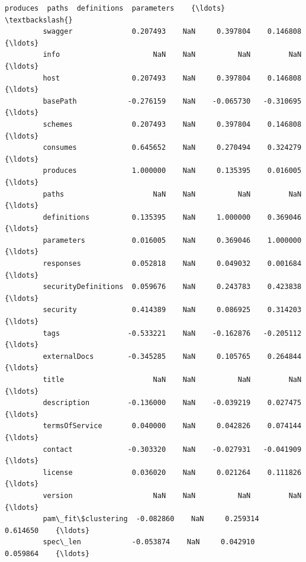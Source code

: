 \documentclass[11pt]{article}
\begin{document}
\begin{Verbatim}[commandchars=\\\{\}]
                              produces  paths  definitions  parameters    {\ldots}     \textbackslash{}
         swagger              0.207493    NaN     0.397804    0.146808    {\ldots}      
         info                      NaN    NaN          NaN         NaN    {\ldots}      
         host                 0.207493    NaN     0.397804    0.146808    {\ldots}      
         basePath            -0.276159    NaN    -0.065730   -0.310695    {\ldots}      
         schemes              0.207493    NaN     0.397804    0.146808    {\ldots}      
         consumes             0.645652    NaN     0.270494    0.324279    {\ldots}      
         produces             1.000000    NaN     0.135395    0.016005    {\ldots}      
         paths                     NaN    NaN          NaN         NaN    {\ldots}      
         definitions          0.135395    NaN     1.000000    0.369046    {\ldots}      
         parameters           0.016005    NaN     0.369046    1.000000    {\ldots}      
         responses            0.052818    NaN     0.049032    0.001684    {\ldots}      
         securityDefinitions  0.059676    NaN     0.243783    0.423838    {\ldots}      
         security             0.414389    NaN     0.086925    0.314203    {\ldots}      
         tags                -0.533221    NaN    -0.162876   -0.205112    {\ldots}      
         externalDocs        -0.345285    NaN     0.105765    0.264844    {\ldots}      
         title                     NaN    NaN          NaN         NaN    {\ldots}      
         description         -0.136000    NaN    -0.039219    0.027475    {\ldots}      
         termsOfService       0.040000    NaN     0.042826    0.074144    {\ldots}      
         contact             -0.303320    NaN    -0.027931   -0.041909    {\ldots}      
         license              0.036020    NaN     0.021264    0.111826    {\ldots}      
         version                   NaN    NaN          NaN         NaN    {\ldots}      
         pam\_fit\$clustering  -0.082860    NaN     0.259314    0.614650    {\ldots}      
         spec\_len            -0.053874    NaN     0.042910    0.059864    {\ldots}      
         

\end{Verbatim}
\end{document}
